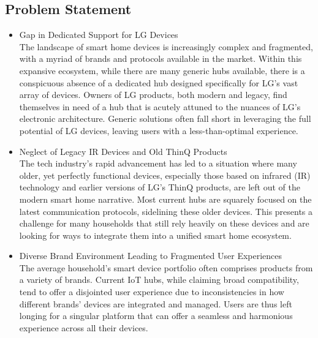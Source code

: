 \documentclass[conference]{IEEEtran}
\begin{document}
\subsection{\large{Problem Statement}}
\begin{itemize}
\item Gap in Dedicated Support for LG Devices\\
The landscape of smart home devices is increasingly complex and fragmented, with a myriad of brands and protocols available in the market. Within this expansive ecosystem, while there are many generic hubs available, there is a conspicuous absence of a dedicated hub designed specifically for LG's vast array of devices. Owners of LG products, both modern and legacy, find themselves in need of a hub that is acutely attuned to the nuances of LG's electronic architecture. Generic solutions often fall short in leveraging the full potential of LG devices, leaving users with a less-than-optimal experience.\\
\item Neglect of Legacy IR Devices and Old ThinQ Products\\
The tech industry's rapid advancement has led to a situation where many older, yet perfectly functional devices, especially those based on infrared (IR) technology and earlier versions of LG's ThinQ products, are left out of the modern smart home narrative. Most current hubs are squarely focused on the latest communication protocols, sidelining these older devices. This presents a challenge for many households that still rely heavily on these devices and are looking for ways to integrate them into a unified smart home ecosystem.\\
\item Diverse Brand Environment Leading to Fragmented User Experiences\\
The average household's smart device portfolio often comprises products from a variety of brands. Current IoT hubs, while claiming broad compatibility, tend to offer a disjointed user experience due to inconsistencies in how different brands' devices are integrated and managed. Users are thus left longing for a singular platform that can offer a seamless and harmonious experience across all their devices.\\
\end{itemize}
\end{document}
